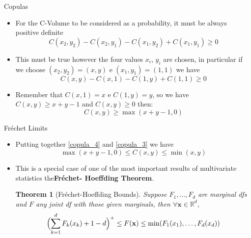 \documentclass[11pt]{beamer}
\theoremstyle{plain}
\newtheorem{thm}{Theorem}[section]
\theoremstyle{definition}
\theoremstyle{remark}
\begin{document}
%
\begin{frame}{Copulas}
   \begin{itemize}
      \item   				  						  
		For the C-Volume to be considered as a probability, it must be always positive 
		definite 
		\begin{equation}
			  C(x_2, y_2) - C(x_2, y_1) - C(x_1, y_2) + C(x_1, y_1) \ge 0
		\end{equation}	  	
	  \item 
	  	This must be true however the four values $x_i$, $y_i$ are chosen, in particular if 
	  	we choose $(x_2, y_2) = (x,y)$ e $(x_1,y_1)=(1,1)$ we have
		\begin{equation}
				  C(x, y) - C(x,1) - C(1,y) + C(1,1) \ge 0
		\end{equation}
	\item 
		Remember that $C(x,1)=x$ e $C(1,y) = y$, so we have $C(x,y) \ge x+y-1 $ and $C(x,y) 
		\ge 0$ then:
		\begin{equation}\label{copula_4}
					C(x,y) \ge \max(x+y-1,0) 
		\end{equation}
\end{itemize}
\end{frame}
%
\begin{frame}{Fréchet Limits}
   \begin{itemize}
   		\item  Putting together \eqref{copula_4} and \eqref{copula_3} we have 
				\begin{equation}
				 \max(x+y-1,0) \le C(x,y) \le \min(x,y)
				\end{equation}
	  	\item This is a special case of one of the most important results of multivariate statistics the\textbf{Fréchet-
	  	Hoeffding Theorem}.

		\begin{thm}[Fréchet-Hoeffding Bounds]
          	Suppose $F_1,\dots, F_d$ are marginal dfs and  $F$ any joint df with those given marginals, then 
          	$\forall \mathbf{x} \in \mathbb{R}^d$,
					\begin{equation}
					\Bigl( 
					\sum\limits_{k=1}^d  F_k(x_k) + 1 -d
					\Bigr)^+
					\le F(\mathbf{x}) \le 
					\min(F_1(x_1),\dots,F_d(x_d))
					\end{equation}
		\end{thm}
   \end{itemize}
\end{frame}
\end{document}
